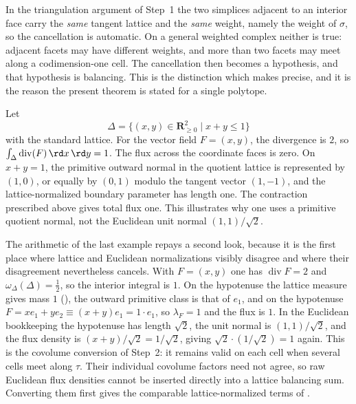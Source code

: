 \begin{remark}
\label{rem:ch11-step4-vs-balancing}
In the triangulation argument of Step~1 the two simplices adjacent to an
interior face carry the
\emph{same} tangent lattice and the \emph{same} weight, namely the weight of
$\sigma$, so the cancellation is automatic.  On a general weighted complex
neither is true: adjacent facets may have different weights, and more than
two facets may meet along a codimension-one cell.  The cancellation then
becomes a hypothesis, and that hypothesis is balancing.  This is the
distinction which  makes precise, and it is the
reason the present theorem is stated for a single polytope.
\end{remark}

\begin{example}
\label{ex:ch11-triangle}
Let
\[
 \Delta=\{(x,y)\in\mathbf R_{\geq0}^2\mid x+y\leq1\}
\]
with the standard lattice.  For the vector field
$F=(x,y)$, the divergence is $2$, so
$\int_\Delta\operatorname{div}(F)\,\rd x\,\rd y=1$.
The flux across the coordinate faces is zero.  On $x+y=1$, the primitive
outward normal in the quotient lattice is represented by $(1,0)$, or equally
by $(0,1)$ modulo the tangent vector $(1,-1)$, and the lattice-normalized
boundary parameter has length one.  The contraction prescribed above gives
total flux one.  This illustrates why one uses a primitive quotient normal,
not the Euclidean unit normal $(1,1)/\sqrt2$.
\end{example}

The arithmetic of the last example repays a second look, because it is the
first place where lattice and Euclidean normalizations visibly disagree and
where their disagreement nevertheless cancels.  With $F=(x,y)$ one has
$\operatorname{div}F=2$ and $\omega_\Delta(\Delta)=\tfrac12$, so the interior
integral is $1$.  On the hypotenuse the lattice measure gives mass $1$
(), the outward primitive class is that
of $e_1$, and on the hypotenuse $F=xe_1+ye_2\equiv(x+y)e_1=1\cdot e_1$, so
$\lambda_F=1$ and the flux is $1$.  In the Euclidean bookkeeping the
hypotenuse has length $\sqrt2$, the unit normal is $(1,1)/\sqrt2$, and the
flux density is $(x+y)/\sqrt2=1/\sqrt2$, giving $\sqrt2\cdot(1/\sqrt2)=1$
again.  This is the covolume conversion of Step~2: it remains valid on
each cell when several cells meet along $\tau$.  Their individual
covolume factors need not agree, so raw Euclidean flux densities cannot
be inserted directly into a lattice balancing sum.  Converting them
first gives the comparable lattice-normalized terms of
.

